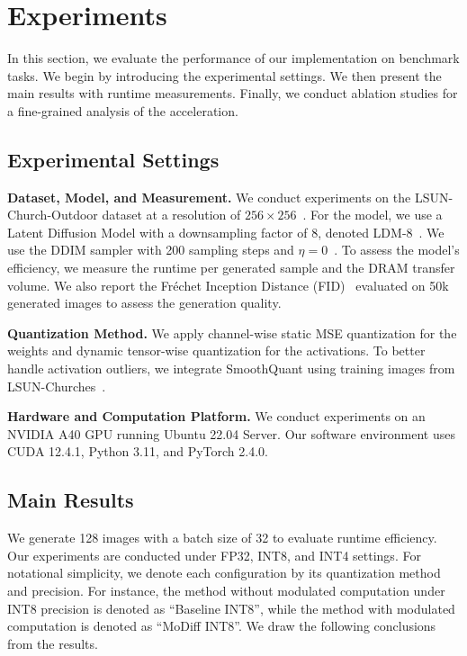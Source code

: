 \section{Experiments}
In this section, we evaluate the performance of our implementation on benchmark tasks. We begin by introducing the experimental settings. We then present the main results with runtime measurements. Finally, we conduct ablation studies for a fine-grained analysis of the acceleration.
% 

\subsection{Experimental Settings}
\textbf{Dataset, Model, and Measurement.} We conduct experiments on the LSUN-Church-Outdoor dataset at a resolution of $256 \times 256$~\citep{yu15lsun}. For the model, we use a Latent Diffusion Model with a downsampling factor of 8, denoted LDM-8~\citep{rombach2022high}. We use the DDIM sampler with 200 sampling steps and $\eta = 0$~\citep{song2020denoising}. 
To assess the model's efficiency, we measure the runtime per generated sample and the DRAM transfer volume. We also report the Fr\'echet Inception Distance (FID)~\citep{heusel2017gans} evaluated on 50k generated images to assess the generation quality.

\textbf{Quantization Method.} We apply channel-wise static MSE quantization for the weights and dynamic tensor-wise quantization for the activations. To better handle activation outliers, we integrate SmoothQuant using training images from LSUN-Churches~\citep{xiao2023smoothquant}. 



\textbf{Hardware and Computation Platform.} We conduct experiments on an NVIDIA A40 GPU running Ubuntu 22.04 Server. Our software environment uses CUDA 12.4.1, Python 3.11, and PyTorch 2.4.0.



\subsection{Main Results}
We generate 128 images with a batch size of 32 to evaluate runtime efficiency. Our experiments are conducted under FP32, INT8, and INT4 settings. For notational simplicity, we denote each configuration by its quantization method and precision. For instance, the method without modulated computation under INT8 precision is denoted as ``Baseline INT8'', while the method with modulated computation is denoted as ``MoDiff INT8''. We draw the following conclusions from the results.

